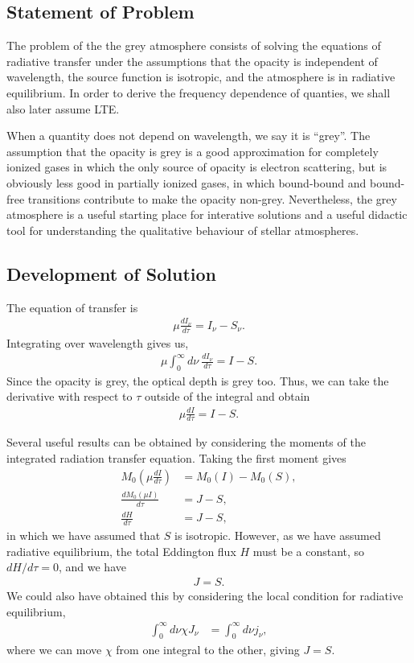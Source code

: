 \subsection{Statement of Problem}

The problem of the the grey atmosphere consists of solving
the equations of radiative transfer under the assumptions
that the opacity is independent of wavelength, the source
function is isotropic, and the atmosphere is in radiative
equilibrium. In order to derive the frequency dependence of
quanties, we shall also later assume LTE.

When a quantity does not depend on wavelength, we say it is
``grey''. The assumption that the opacity is grey is a good
approximation for completely ionized gases in which the only
source of opacity is electron scattering, but is obviously
less good in partially ionized gases, in which bound-bound
and bound-free transitions contribute to make the opacity
non-grey. Nevertheless, the grey atmosphere is a useful
starting place for interative solutions and a useful
didactic tool for understanding the qualitative behaviour of
stellar atmospheres.

\newslide

\subsection{Development of Solution}

The equation of transfer is
\begin{align}
\mu \frac{dI_\nu}{d\tau} = I_\nu - S_\nu.
\end{align}
Integrating over wavelength gives us,
\begin{align}
\mu \int_0^\infty\!\!\!d\nu\:\frac{dI_\nu}{d\tau} = I - S.
\end{align}
Since the opacity is grey, the optical depth is grey too. Thus, we can take the derivative with respect to $\tau$ outside of the integral and obtain
\begin{align}
\mu \frac{dI}{d\tau} = I - S.
\end{align}

\newslide

Several useful results can be obtained by considering the
moments of the integrated radiation transfer equation.
Taking the first moment gives
\begin{align}
M_0(\mu\frac{dI}{d\tau}) &= M_0(I) - M_0(S),\\
\frac{dM_0(\mu I)}{d\tau} &= J - S,\\
\frac{dH}{d\tau} &= J-S,
\end{align}
in which we have assumed that $S$ is isotropic.
However, as we have assumed radiative equilibrium, the total
Eddington flux $H$ must be a constant, so $dH/d\tau = 0$,
and we have
\begin{align}
J = S.
\end{align}
We could also have obtained this by considering the local condition for
radiative equilibrium,
\begin{align}
\int_0^\infty\!\!\!d\nu
\chi J_\nu
&=
\int_0^\infty\!\!\!d\nu
j_\nu,
\end{align}
where we can move $\chi$ from one integral to the other, giving $J=S$.


